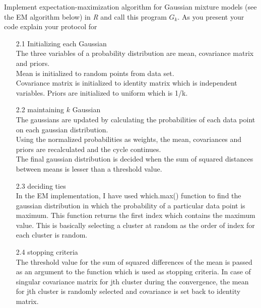 \documentclass{article}
\begin{document}
 Implement expectation-maximization algorithm for Gaussian mixture models (see the EM algorithm below) in \textit{R}  and call this program $G_k$. As you present your code explain your protocol for


\begin{enumerate}
  \item[2.1] Initializing each Gaussian \\
  			The three variables of a probability distribution are mean, covariance matrix and priors.\\
            Mean is initialized to random points from data set.\\
            Covariance matrix is initialized to identity matrix which is independent variables.
            Priors are initialized to uniform which is 1/k.
            
  \item[2.2] maintaining $k$ Gaussian\\
  The gaussians are updated by calculating the probabilities of each data point on each gaussian distribution. \\
  Using the normalized probabilities as weights, the mean, covariances and priors are recalculated and the cycle continues. \\
  The final gaussian distribution is decided when the sum of squared distances between means is lesser than a threshold value. 
  \item[2.3]  deciding ties\\
  In the EM implementation, I have used which.max() function to find the gaussian distribution in which the probability of a particular data point is maximum. This function returns the first index which contains the maximum value. This is basically selecting a cluster at random as the order of index for each cluster is random.
  \item[2.4] stopping criteria\\
  The threshold value for the sum of squared differences of the mean is passed as an argument to the function which is used as stopping criteria.
  In case of singular covariance matrix for jth cluster during the convergence, the  mean for jth cluster is randomly selected and covariance is set back to identity matrix. 
\end{enumerate}




\end{document}
